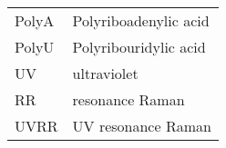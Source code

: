 

\noindent
\begin{tabularx}{\textwidth}{@{}l@{\,\dotfill\dots\,}X@{}}
PolyA&Polyriboadenylic acid\\
PolyU&Polyribouridylic acid\\
UV&ultraviolet\\
RR&resonance Raman\\
UVRR&UV resonance Raman\\
\end{tabularx}
